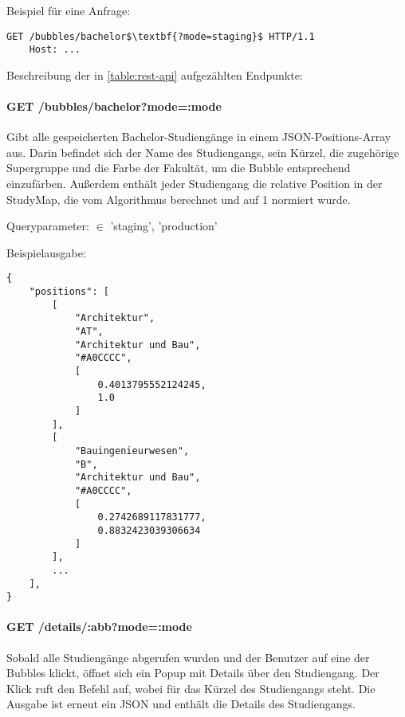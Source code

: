 \noindent
\begin{minipage}{\linewidth}
Beispiel für eine Anfrage:
\begin{lstlisting}[style=Python, mathescape=true]
    GET /bubbles/bachelor$\textbf{?mode=staging}$ HTTP/1.1
    Host: ...
\end{lstlisting}
\end{minipage}

\noindent
Beschreibung der in \autoref{table:rest-api} aufgezählten Endpunkte:

\paragraph*{GET /bubbles/bachelor?mode=:mode}
\vspace{-1.0em}
Gibt alle gespeicherten Bachelor-Studiengänge in einem JSON-Positions-Array aus. Darin befindet sich der Name des Studiengangs, sein Kürzel, die zugehörige Supergruppe und die Farbe der Fakultät, um die Bubble entsprechend einzufärben. Außerdem enthält jeder Studiengang die relative Position in der StudyMap, die vom Algorithmus berechnet und auf 1 normiert wurde.

\noindent
Queryparameter:  $\in$ {'staging', 'production'}

\noindent
Beispielausgabe:

\begin{lstlisting}[style=Python]
{
    "positions": [
        [
            "Architektur",
            "AT",
            "Architektur und Bau",
            "#A0CCCC",
            [
                0.4013795552124245,
                1.0
            ]
        ],
        [
            "Bauingenieurwesen",
            "B",
            "Architektur und Bau",
            "#A0CCCC",
            [
                0.2742689117831777,
                0.8832423039306634
            ]
        ],
        ...
    ],
}
\end{lstlisting}

\paragraph*{GET /details/:abb?mode=:mode}
\vspace{-1.0em}
Sobald alle Studiengänge abgerufen wurden und der Benutzer auf eine der Bubbles klickt, öffnet sich ein Popup mit Details über den Studiengang. Der Klick ruft den Befehl  auf, wobei  für das Kürzel des Studiengangs steht. Die Ausgabe ist erneut ein JSON und enthält die Details des Studiengangs.

